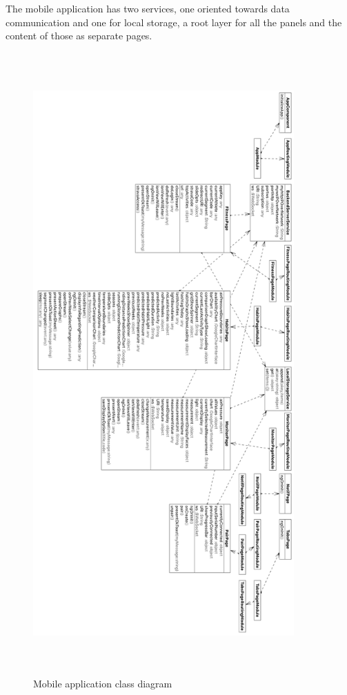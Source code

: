 The mobile application has two services, one oriented towards data communication and one for local storage, a root layer for all the panels and the content of those as separate pages. 

\begin{figure}[htp]
    \centering
    \includegraphics[width=10cm,height=23.8385cm]{figures/macd}
    \caption{Mobile application class diagram}
    \label{fig:maclassdiagram}
\end{figure}

